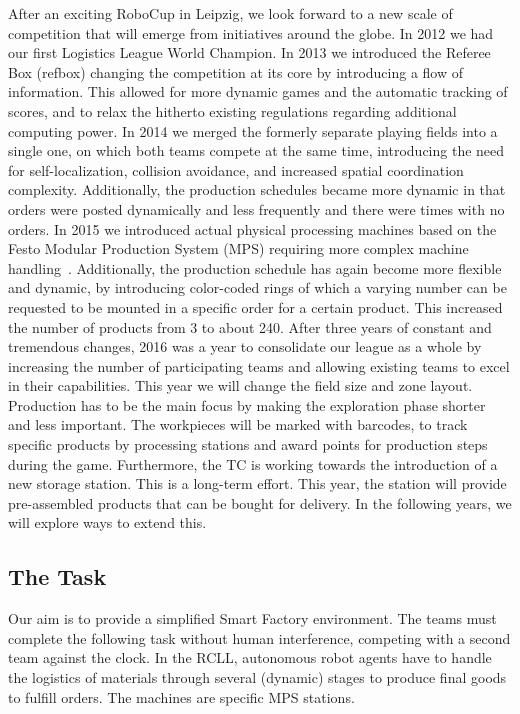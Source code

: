 \documentclass[12pt,twoside]{article}
\begin{document}
After an exciting RoboCup in Leipzig, we look forward to a new scale of
competition that will emerge from initiatives around the globe. In
2012 we had our first Logistics League World Champion.  In 2013 we
introduced the Referee Box (refbox) changing the competition at its
core by introducing a flow of information. This allowed for more
dynamic games and the automatic tracking of scores, and to relax the
hitherto existing regulations regarding additional computing power. In
2014 we merged the formerly separate playing fields into a single one,
on which both teams compete at the same time, introducing the need for
self-localization, collision avoidance, and increased spatial
coordination complexity. Additionally, the production schedules became
more dynamic in that orders were posted dynamically and less
frequently and there were times with no orders. In 2015 we introduced
actual physical processing machines based on the Festo Modular
Production System (MPS) requiring more complex machine
handling~\cite{wdrl2013}. Additionally, the production schedule has
again become more flexible and dynamic, by introducing color-coded
rings of which a varying number can be requested to be mounted in a
specific order for a certain product. This increased the number of
products from 3 to about 240. After three years of constant and
tremendous changes, 2016 was a year to consolidate our league as a
whole by increasing the number of participating teams and allowing
existing teams to excel in their capabilities. This year we will change
the field size and zone layout. Production has to be the main focus by
making the exploration phase shorter and less important.
The workpieces will be marked with barcodes, to track specific
products by processing stations and award points for production
steps during the game. Furthermore, the TC is working towards the
introduction of a new storage station. This is a long-term
effort. This year, the station will provide pre-assembled products
that can be bought for delivery. In the following years, we will
explore ways to extend this.

\subsection{The Task}
\label{sec:task}

Our aim is to provide a simplified Smart Factory environment. The
teams must complete the following task without human interference,
competing with a second team against the clock. In the RCLL,
autonomous robot agents have to handle the logistics of materials
through several (dynamic) stages to produce final goods to fulfill
orders. The machines are specific MPS stations.
\end{document}
